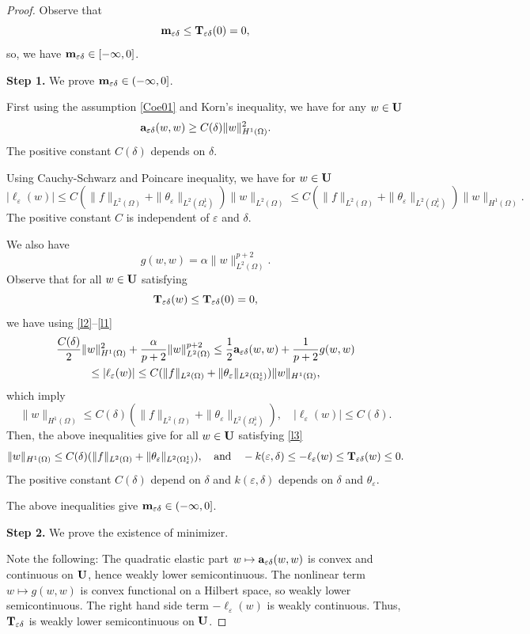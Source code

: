 \documentclass[10pt,a4paper]{amsart}
\def\GT{{\bf T}}
\def\GU{{\bf U}}
\def\Ga{{\bf a}}
\def\Gm{{\bf m}}
\def\O{\Omega}
\def\a{{\alpha}}
\def\d{\delta}
\def\ed{{\varepsilon\delta}}
\def\e{\varepsilon}
\begin{document}
\begin{proof}
	Observe that
	$$\Gm_\ed\leq \GT_\ed(0)=0,$$
	so, we have $\Gm_\ed\in [-\infty,0]$. 
	
	{\bf Step 1.} We prove $\Gm_\ed\in(-\infty,0]$.
	
	First using the assumption \eqref{Coe01} and Korn's inequality, we have for any $w\in\GU$
	\begin{equation}\label{l2}
		\Ga_\ed(w,w)\geq C(\d)\|w\|^2_{H^1(\O)}.
	\end{equation}
	The positive constant  $C(\d)$  depends on $\d$. 
		
	Using Cauchy-Schwarz and Poincare inequality, we have for $w\in \GU$
	\begin{equation}\label{l1}
		|\ell_\e(w)|\leq C(\|f\|_{L^2(\O)}+\|\theta_\e\|_{L^2(\O^1_\e)})\|w\|_{L^2(\O)}\leq C(\|f\|_{L^2(\O)}+\|\theta_\e\|_{L^2(\O^1_\e)})\|w\|_{H^1(\O)}.
	\end{equation}
	The positive constant $C$ is independent of $\e$ and $\d$.
	
	We also have
	$$g(w,w)=\alpha\|w\|^{p+2}_{L^2(\O)}.$$
	Observe that for all $w\in\GU$ satisfying
	\begin{equation}\label{l3}
		\GT_\ed(w)\leq \GT_\ed(0)=0,
	\end{equation}
	we have using \eqref{l2}--\eqref{l1}
	\begin{multline}\label{AP01}
		{C(\d)\over 2}\|w\|^2_{H^1(\O)}+{\a\over p+2}\|w\|^{p+2}_{L^2(\O)}\leq {1\over 2}\Ga_\ed(w,w)+{1\over p+2}g(w,w)\\
		\leq |\ell_\e(w)|\leq C(\|f\|_{L^2(\O)}+\|\theta_\e\|_{L^2(\O^1_\e)})\|w\|_{H^1(\O)},
	\end{multline}
	which imply
	$$\|w\|_{H^1(\O)}\leq C(\d)(\|f\|_{L^2(\O)}+\|\theta_\e\|_{L^2(\O^1_ \e)}),\quad |\ell_\e(w)|\leq C(\d).$$
	Then, the above inequalities give for all $w\in\GU$ satisfying \eqref{l3}
	\begin{equation}\label{l4}
		\|w\|_{H^1(\O)}\leq C(\d)(\|f\|_{L^2(\O)}+\|\theta_\e\|_{L^2(\O^1_\e)}),\quad	\text{and}\quad
		-k(\e,\d)\leq -\ell_\e(w)\leq \GT_\ed(w)\leq 0.
	\end{equation}
	The positive constant $C(\d)$ depend on $\d$ and $k(\e,\d)$ depends on $\d$ and $\theta_\e$.

	The above inequalities give $\Gm_\ed\in(-\infty,0]$.
	
	{\bf Step 2.} We prove the existence of minimizer.
	
	Note the following: The quadratic elastic part $w\mapsto\Ga_\ed(w,w)$ is convex and continuous on $\GU$, hence weakly lower semicontinuous. The nonlinear term $w\mapsto g(w,w)$ is convex functional on a Hilbert space, so weakly lower semicontinuous. The right hand side term $-\ell_\e(w)$ is weakly continuous. Thus, $\GT_\ed$ is weakly lower semicontinuous on $\GU$. 
	

\end{proof}
\end{document}
